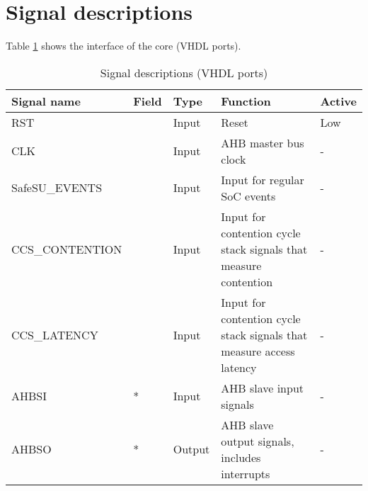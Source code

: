\section{Signal descriptions}
Table \ref{t_ports} shows the interface of the core (VHDL ports).
\begin{table}[H]
	\caption{Signal descriptions (VHDL ports)}
	\label{t_ports}
	\centering
	\begin{footnotesize}
	\begin{tabular}{|l|l|l|l|l|}
		\hline
		\textbf{Signal name} & \textbf{Field}  & \textbf{Type}  & \textbf{Function} & \textbf{Active}\\
		\hline
		RST & &Input &Reset & Low\\
		\hline
		CLK & &Input &AHB master bus clock & -\\
		\hline
		SafeSU\_EVENTS & &Input & Input for regular SoC events & -\\
		\hline
		CCS\_CONTENTION & &Input & Input for contention cycle stack signals that measure contention  & -\\
		\hline
		CCS\_LATENCY & &Input & Input for contention cycle stack signals that measure access latency & -\\
		\hline
		AHBSI & * &Input & AHB slave input signals& -\\
		\hline
		AHBSO & * &Output &AHB slave output signals, includes interrupts & - \\
		\hline
	\end{tabular}
\end{footnotesize}
\end{table}



